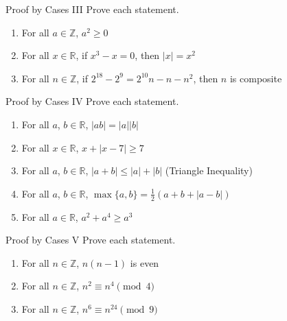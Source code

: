 \documentclass[12pt,letterpaper]{article}
\begin{document}
\begin{problem}{Proof by Cases III}
 Prove each statement.

 \begin{enumerate}[\hspace{.5cm}a.]
  \item For all $a\in\mathbb{Z}$, $a^2\ge 0$
  \item For all $x\in\mathbb{R}$, if $x^3-x=0$, then $\left|x\right|=x^2$
  \item For all $n\in\mathbb{Z}$, if $2^{18} - 2^9 = 2^{10}n - n - n^2$,
  then $n$ is composite
 \end{enumerate}
\end{problem}

\begin{problem}{Proof by Cases IV}
 Prove each statement.

 \begin{enumerate}[\hspace{.5cm}a.]
  \item For all $a$, $b\in\mathbb{R}$,
  $\left|ab\right|=\left|a\right|\left|b\right|$
  \item For all $x\in\mathbb{R}$, $x+\left|x-7\right|\ge7$
  \item For all $a$, $b\in\mathbb{R}$,
  $\left|a+b\right|\le\left|a\right|+\left|b\right|$ \hfill
  (Triangle Inequality)
  \item For all $a$, $b\in\mathbb{R}$, $\max{\{a,b\}} = \frac{1}{2} \left(
  a + b + \left|a-b\right| \right)$
  \item For all $a\in\mathbb{R}$, $a^2+a^4\ge a^3$
 \end{enumerate}
\end{problem}

\begin{problem}{Proof by Cases V}
 Prove each statement.

 \begin{enumerate}[\hspace{.5cm}a.]
  \item For all $n\in\mathbb{Z}$, $n(n-1)$ is even
  \item For all $n\in\mathbb{Z}$, $n^2 \equiv n^4 \pmod{4}$
  \item For all $n\in\mathbb{Z}$, $n^6 \equiv n^{24} \pmod{9}$
 \end{enumerate}
\end{problem}
\end{document}

